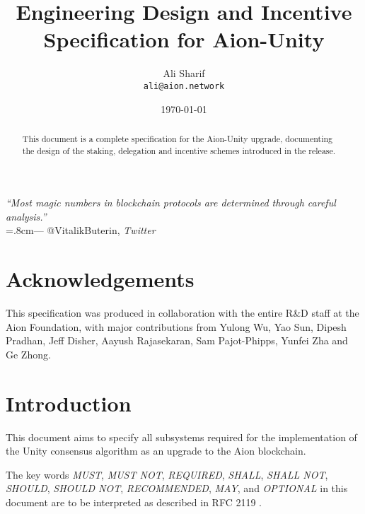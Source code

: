 \documentclass{article}
\title{Engineering Design and Incentive\\Specification for Aion-Unity}
\author{
    Ali Sharif\\
    \texttt{ali@aion.network}
}
\date{\today}
\begin{document}
\maketitle

\begin{flushright}
\rightskip=1.8cm\textit{``Most magic numbers in blockchain protocols are determined through careful analysis.''} \\
\vspace{.2em}
\rightskip=.8cm--- @VitalikButerin, \textit{Twitter}
\end{flushright}
\vspace{1em}

\begin{abstract}
This document is a complete specification for the Aion-Unity upgrade, documenting the design of the staking, delegation and incentive schemes introduced in the release. 
\end{abstract}

\section*{Acknowledgements}
This specification was produced in collaboration with the entire R\&D staff at the Aion Foundation, with major contributions from Yulong Wu, Yao Sun, Dipesh Pradhan, Jeff Disher, Aayush Rajasekaran, Sam Pajot-Phipps, Yunfei Zha and Ge Zhong. 

\newpage
\tableofcontents
\newpage

\section{Introduction}
This document aims to specify all subsystems required for the implementation of the Unity consensus algorithm \cite{WZS19} as an upgrade to the Aion blockchain.

The key words \textit{MUST}, \textit{MUST NOT}, \textit{REQUIRED}, \textit{SHALL}, \textit{SHALL NOT}, \textit{SHOULD}, \textit{SHOULD NOT}, \textit{RECOMMENDED}, \textit{MAY}, and \textit{OPTIONAL} in this document are to be interpreted as described in RFC 2119 \cite{RFC2119}.


%

\pagebreak



\clearpage
\begin{appendices}

\end{appendices}
\end{document}

